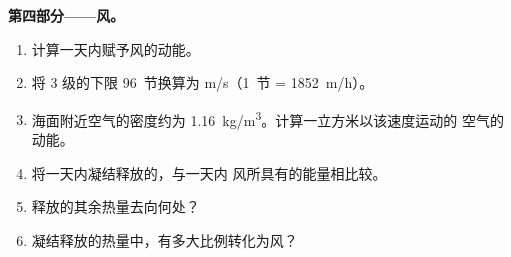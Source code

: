 \begin{problem}
\medskip
\noindent\textbf{第四部分——风。}
\begin{enumerate}[resume]
  \item 计算一天内赋予风的动能。
  \item 将 3 级的下限 \num{96}~节换算为
        \unit{m/s}（\num{1}~节 = \qty{1852}{m/h}）。
  \item 海面附近空气的密度约为
        \qty{1.16}{kg/m^3}。计算一立方米以该速度运动的
        空气的动能。
  \item 将一天内凝结释放的，与一天内
        风所具有的能量相比较。
  \item 释放的其余热量去向何处？
  \item 凝结释放的热量中，有多大比例转化为风？
\end{enumerate}
\end{problem}
